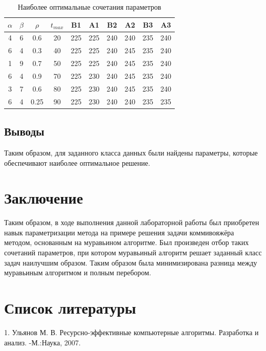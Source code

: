 \documentclass[a4paper,14pt]{report}
\begin{document}
\begin{table}[h]
	\caption{Наиболее оптимальные сочетания параметров}
		\begin{tabular}{| c | c | c | c || c | c || c | c || c | c |}
	 	\hline
		$\alpha$ & $\beta$ & $\rho$ & $t_{max}$ & B1 & A1 & B2 & A2 & B3 & A3 \\ [0.5ex]
	 	\hline\hline
		4 & 6 & 0.6 & 20 & 225 & 225 & 240 & 240 & 235 & 240 \\ \hline
		6 & 4 & 0.3 & 40 & 225 & 225 & 240 & 245 & 235 & 240 \\ \hline
		1 & 9 & 0.7 & 50 & 225 & 225 & 240 & 245 & 235 & 240 \\ \hline
		6 & 4 & 0.9 & 70 & 225 & 230 & 240 & 245 & 235 & 240 \\ \hline
		3 & 7 & 0.6 & 80 & 225 & 230 & 240 & 245 & 235 & 240 \\ \hline
		6 & 4 & 0.25 & 90 & 225 & 230 & 240 & 240 & 235 & 235 \\ \hline
		\end{tabular}
\end{table}

\section*{Выводы}

Таким образом, для заданного класса данных были найдены параметры, которые обеспечивают наиболее оптимальное решение.

\chapter*{Заключение}

Таким образом, в ходе выполнения данной лабораторной работы был приобретен навык параметризации метода на примере решения задачи коммивояжёра методом, основанным на муравьином алгоритме. Был произведен отбор таких сочетаний параметров, при котором муравьиный алгоритм решает заданный класс задач наилучшим образом. Таким образом была минимизирована разница между муравьиным алгоритмом и полным перебором.

\chapter*{Список литературы}

1. Ульянов М. В. Ресурсно-эффективные компьютерные алгоритмы. Разработка и анализ. -М.:Наука, 2007.
\end{document}

